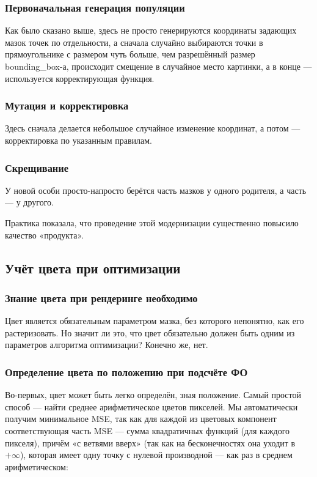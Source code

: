 \subsubsection{Первоначальная генерация популяции}
Как было сказано выше, здесь не просто генерируются координаты задающих мазок точек по отдельности,
а сначала случайно выбираются точки в прямоугольнике с размером чуть больше, чем разрешённый размер bounding\_box-а,
происходит смещение в случайное место картинки,
а в конце — используется корректирующая функция.

\subsubsection{Мутация и корректировка}
Здесь сначала делается небольшое случайное изменение координат, а потом — корректировка по указанным правилам.

\subsubsection{Скрещивание}
У новой особи просто-напросто берётся часть мазков у одного родителя, а часть — у другого.

Практика показала, что проведение этой модернизации существенно повысило качество «продукта».



\subsection{Учёт цвета при оптимизации}\label{subsec:color_in_genome}

\subsubsection{Знание цвета при рендеринге необходимо}
Цвет является обязательным параметром мазка, без которого непонятно, как его растеризовать.
Но значит ли это, что цвет обязательно должен быть одним из параметров алгоритма оптимизации?
Конечно же, нет.

\subsubsection{Определение цвета по положению при подсчёте ФО}
Во-первых, цвет может быть легко определён, зная положение.
Самый простой способ — найти среднее арифметическое цветов пикселей.
Мы автоматически получим минимальное MSE,
так как для каждой из цветовых компонент соответствующая часть MSE — сумма квадратичных функций (для каждого пикселя),
причём «с ветвями вверх» (так как на бесконечностях она уходит в $+ \infty$), которая имеет одну точку с нулевой производной — как раз в среднем арифметическом:

